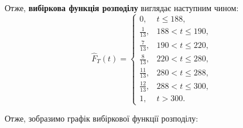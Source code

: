 \documentclass{../hw_template}
\begin{document}
Отже, \textbf{вибіркова функція розподілу} виглядає наступним чином:
\begin{equation*}
    \hat{F}_T(t) = 
    \begin{cases}
        0, & t \leq 188,\\
        \frac{1}{13}, & 188 < t \leq 190,\\
        \frac{7}{13}, & 190 < t \leq 220,\\
        \frac{8}{13}, & 220 < t \leq 280,\\
        \frac{11}{13}, & 280 < t \leq 288,\\
        \frac{12}{13}, & 288 < t \leq 300, \\
        1, & t > 300.
    \end{cases}
\end{equation*}

Отже, зобразимо графік вибіркової функції розподілу:
\end{document}
